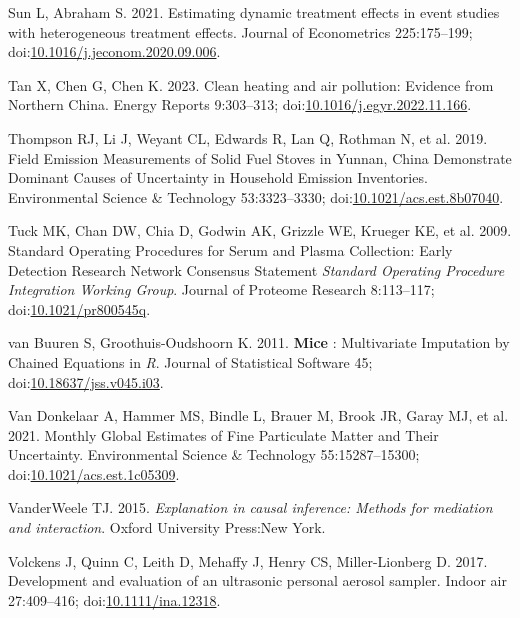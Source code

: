 \documentclass[
  letterpaper,
  DIV=11,
  numbers=noendperiod]{scrartcl}
\newlength{\cslhangindent}
\newenvironment{CSLReferences}[2] %
 {\begin{list}{}{%
  \setlength{\itemindent}{0pt}
  \setlength{\leftmargin}{0pt}
  \setlength{\parsep}{0pt}
  \ifodd #1
   \setlength{\leftmargin}{\cslhangindent}
   \setlength{\itemindent}{-1\cslhangindent}
  \fi
  \setlength{\itemsep}{#2\baselineskip}}}
 {\end{list}}
\begin{document}
\begin{CSLReferences}{1}{1}
Sun L, Abraham S. 2021. Estimating dynamic treatment effects in event
studies with heterogeneous treatment effects. Journal of Econometrics
225:175--199;
doi:\href{https://doi.org/10.1016/j.jeconom.2020.09.006}{10.1016/j.jeconom.2020.09.006}.

Tan X, Chen G, Chen K. 2023. Clean heating and air pollution: {Evidence}
from {Northern China}. Energy Reports 9:303--313;
doi:\href{https://doi.org/10.1016/j.egyr.2022.11.166}{10.1016/j.egyr.2022.11.166}.

Thompson RJ, Li J, Weyant CL, Edwards R, Lan Q, Rothman N, et al. 2019.
Field {Emission Measurements} of {Solid Fuel Stoves} in {Yunnan}, {China
Demonstrate Dominant Causes} of {Uncertainty} in {Household Emission
Inventories}. Environmental Science \& Technology 53:3323--3330;
doi:\href{https://doi.org/10.1021/acs.est.8b07040}{10.1021/acs.est.8b07040}.

Tuck MK, Chan DW, Chia D, Godwin AK, Grizzle WE, Krueger KE, et al.
2009. Standard {Operating Procedures} for {Serum} and {Plasma
Collection}: {Early Detection Research Network Consensus Statement}
{\emph{Standard Operating Procedure Integration Working Group}}. Journal
of Proteome Research 8:113--117;
doi:\href{https://doi.org/10.1021/pr800545q}{10.1021/pr800545q}.

van Buuren S, Groothuis-Oudshoorn K. 2011. {\textbf{Mice}} :
{Multivariate Imputation} by {Chained Equations} in {\emph{R}}. Journal
of Statistical Software 45;
doi:\href{https://doi.org/10.18637/jss.v045.i03}{10.18637/jss.v045.i03}.

Van Donkelaar A, Hammer MS, Bindle L, Brauer M, Brook JR, Garay MJ, et
al. 2021. Monthly {Global Estimates} of {Fine Particulate Matter} and
{Their Uncertainty}. Environmental Science \& Technology
55:15287--15300;
doi:\href{https://doi.org/10.1021/acs.est.1c05309}{10.1021/acs.est.1c05309}.

VanderWeele TJ. 2015. \emph{Explanation in causal inference: Methods for
mediation and interaction}. Oxford University Press:New York.

Volckens J, Quinn C, Leith D, Mehaffy J, Henry CS, Miller-Lionberg D.
2017. Development and evaluation of an ultrasonic personal aerosol
sampler. Indoor air 27:409--416;
doi:\href{https://doi.org/10.1111/ina.12318}{10.1111/ina.12318}.


\end{CSLReferences}
\end{document}
